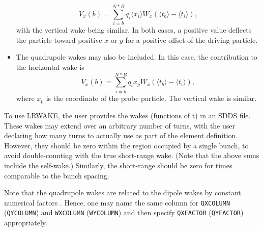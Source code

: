 \begin{itemize}
  \begin{equation}
    V_x(b) = \sum\limits_{i=b}^{N*B} q_i \langle x_i \rangle W_x(\langle t_b \rangle - \langle t_i \rangle),
  \end{equation}
with the vertical wake being similar.
In both cases, a positive value deflects the particle toward positive $x$ or $y$ for a positive offset of the
driving particle.
\item The quadrupole wakes may also be included. In this case, the contribution to the horizontal wake is 
  \begin{equation}
    V_x(b) = \sum\limits_{i=b}^{N*B} q_i x_p W_x(\langle t_b \rangle - \langle t_i \rangle),
  \end{equation}
where $x_p$ is the coordinate of the probe particle. The vertical wake is similar.
\end{itemize}

To use LRWAKE, the user provides the wakes (functions of t) in an SDDS file.
These wakes may extend over an arbitrary number of turns, with the user declaring how many turns
to actually use as part of the element definition.
However, they should be zero within the region occupied by a single bunch, to avoid
double-counting with the true short-range wake.
(Note that the above sums include the self-wake.)
Similarly, the short-range should be zero for times comparable to the bunch spacing.

Note that the quadrupole wakes are related to the dipole wakes by constant numerical factors \cite{Chao-PRSTAB-111001}. Hence,
one may name the same column for \verb|QXCOLUMN| (\verb|QYCOLUMN|) and \verb|WXCOLUMN| (\verb|WYCOLUMN|)
and then specify \verb|QXFACTOR| (\verb|QYFACTOR|) appropriately.


